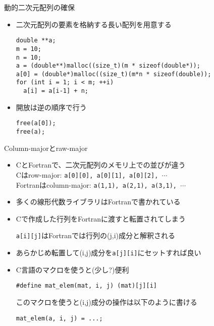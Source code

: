 \begin{frame}[t,fragile]{動的二次元配列の確保}
  \begin{itemize}
    \setlength{\itemsep}{1em}
  \item 二次元配列の要素を格納する長い配列を用意する
\begin{lstlisting}
double **a;
m = 10;  
n = 10;  
a = (double**)malloc((size_t)(m * sizeof(double*));
a[0] = (double*)malloc((size_t)(m*n * sizeof(double));
for (int i = 1; i < m; ++i)
  a[i] = a[i-1] + n;
\end{lstlisting}
  \item 開放は逆の順序で行う
\begin{lstlisting}
free(a[0]);
free(a);
\end{lstlisting}
  \end{itemize}
\end{frame}

\begin{frame}[t,fragile]{Column-majorとraw-major}
  \begin{itemize}
  \item CとFortranで、二次元配列のメモリ上での並びが違う \\
    Cはrow-major: {\tt a[0][0], a[0][1], a[0][2], $\cdots$} \\
    Fortranはcolumn-major: {\tt a(1,1), a(2,1), a(3,1), $\cdots$}
  \item 多くの線形代数ライブラリはFortranで書かれている
  \item Cで作成した行列をFortranに渡すと転置されてしまう

    {\tt a[i][j]}はFortranでは行列の(j,i)成分と解釈される
  \item あらかじめ転置して(i,j)成分を{\tt a[j][i]}にセットすれば良い
  \item C言語のマクロを使うと(少し?)便利
\begin{lstlisting}
#define mat_elem(mat, i, j) (mat)[j][i]
\end{lstlisting}
このマクロを使うと(i,j)成分の操作は以下のように書ける
\begin{lstlisting}
mat_elem(a, i, j) = ...;
\end{lstlisting}
  \end{itemize}
\end{frame}

